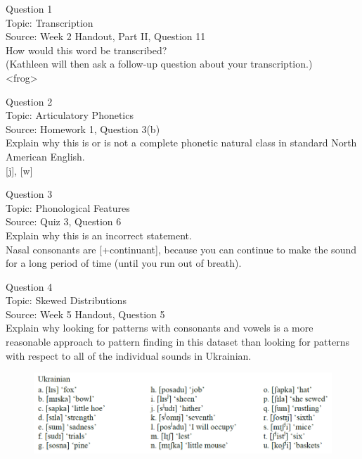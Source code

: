 \documentclass[12pt]{article}
\begin{document}
{\large Question 1}\\

Topic: Transcription\\
Source: Week 2 Handout, Part II, Question 11\\

How would this word be transcribed?\\ (Kathleen will then ask a follow-up question about your transcription.)\\

<frog>


\newpage

{\large Question 2}\\

Topic: Articulatory Phonetics\\
Source: Homework 1, Question 3(b)\\

Explain why this is or is not a complete phonetic natural class in standard North American English.\\

{[j]}, {[w]}


\newpage

{\large Question 3}\\

Topic: Phonological Features\\
Source: Quiz 3, Question 6\\

Explain why this is an incorrect statement.\\

Nasal consonants are {[+continuant]}, because you can continue to make the sound for a long period of time (until you run out of breath).


\newpage

{\large Question 4}\\

Topic: Skewed Distributions\\
Source: Week 5 Handout, Question 5\\

Explain why looking for patterns with consonants and vowels is a more reasonable approach to pattern finding in this dataset than looking for patterns with respect to all of the individual sounds in Ukrainian.\\

\begin{figure}[H]
\includegraphics{../images/ukrainian.png}
\end{figure}
\end{document}
